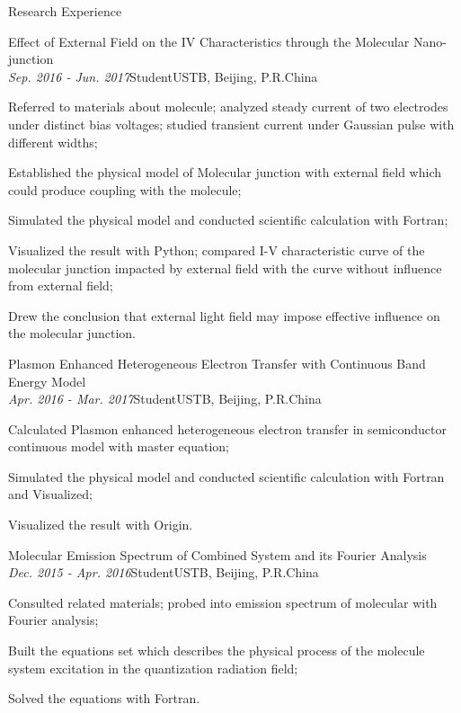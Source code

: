\documentclass[UTF8]{resume}    %
\begin{document}
\begin{rSection}{Research Experience}
    
    \begin{rSubsection}{Effect of External Field on the IV Characteristics through the Molecular Nano-junction\\}{\em Sep. 2016 - Jun. 2017}{Student}{USTB, Beijing, P.R.China}
    \item Referred to materials about molecule; analyzed steady current of two electrodes under distinct bias voltages; studied transient current under Gaussian pulse with different widths;
    \item Established the physical model of Molecular junction with external field which could produce coupling with the molecule;
    \item Simulated the physical model and conducted scientific calculation with Fortran;
    \item Visualized the result with Python; compared I-V characteristic curve of the molecular junction impacted by external field with the curve without influence from external field; 
    \item Drew the conclusion that external light field may impose effective influence on the molecular junction.
    \end{rSubsection}
        
    \begin{rSubsection}{Plasmon Enhanced Heterogeneous Electron Transfer with Continuous Band Energy Model\\}{\em Apr. 2016 - Mar. 2017}{Student}{USTB, Beijing, P.R.China}
    \item Calculated Plasmon enhanced heterogeneous electron transfer in semiconductor continuous model with master equation;
    \item Simulated the physical model and conducted scientific calculation with Fortran and Visualized;
    \item Visualized the result with Origin.
    \end{rSubsection}
        
    \begin{rSubsection}{Molecular Emission Spectrum of Combined System and its Fourier Analysis\\}{\em Dec. 2015 - Apr. 2016}{Student}{USTB, Beijing, P.R.China}
    \item Consulted related materials; probed into emission spectrum of molecular with Fourier analysis;
    \item Built the equations set which describes the physical process of the molecule system excitation in the quantization radiation field;
    \item Solved the equations with Fortran.
    \end{rSubsection}
       
    \end{rSection}
    
\end{document}
